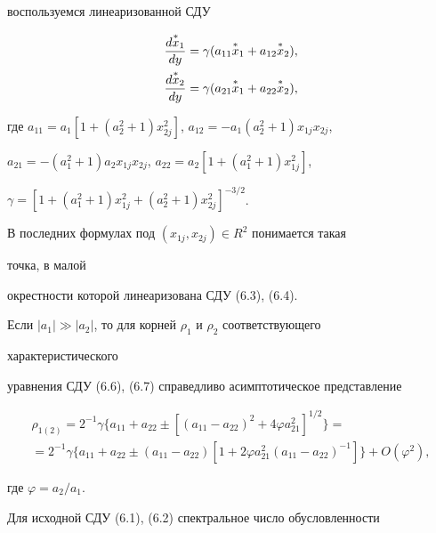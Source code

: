 воспользуемся линеаризованной СДУ 


\begin{gather} 


\frac{d\up{*}{x}_1}{dy}=\gamma(a_{11}\up{*}{x}_1+ 


a_{12}\up{*}{x}_2),\\ 


% 


\frac{d\up{*}{x}_2}{dy}=\gamma(a_{21}\up{*}{x}_1+ 


a_{22}\up{*}{x}_2), 


\end{gather} 


где $a_{11}=a_1[1+(a^2_2+1)x^2_{2j}]$, $a_{12}=-a_1(a^2_2+1)x_{1j}x_{2j}$, 


$a_{21}=-(a^2_1+1)a_2x_{1j}x_{2j}$, $a_{22}=a_2[1+(a^2_1+1)x^2_{1j}]$, 


$\gamma=[1+(a^2_1+1)x^2_{1j}+(a^2_2+1)x^2_{2j}]^{-3/2}$. 


 


В последних формулах под $(x_{1j},x_{2j})\in R^2$ понимается такая 


точка, в малой 


окрестности которой линеаризована СДУ (6.3), (6.4). 


 


Если $|a_1|\gg|a_2|$, то для корней $\rho_1$ и $\rho_2$ соответствующего 


характеристического 


уравнения СДУ (6.6), (6.7) справедливо асимптотическое представление 


\begin{multline*} 


\rho_{1(2)}=2^{-1}\gamma\{a_{11}+a_{22}\pm[(a_{11}-a_{22})^2+ 


4\varphi a^2_{21}]^{1/2}\}= \\


%


=2^{-1}\gamma\{a_{11}+a_{22}\pm 


(a_{11}-a_{22})[1+2\varphi a^2_{21}(a_{11}-a_{22})^{-1}]\} 


+O(\varphi^2), 


\end{multline*}  


где $\varphi=a_2/a_1$. 


 


Для исходной СДУ (6.1), (6.2) спектральное число обусловленности 


